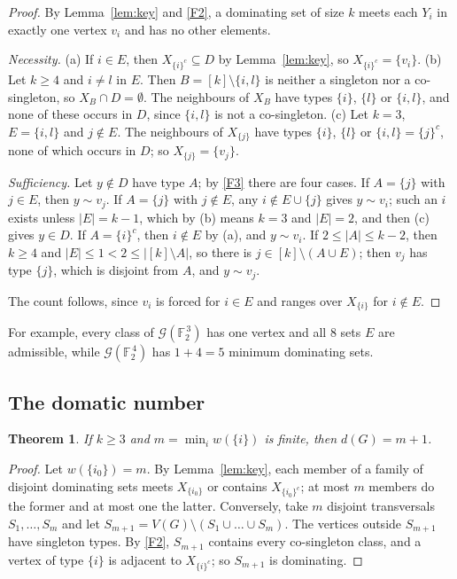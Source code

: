 \documentclass[11pt]{amsart}
\newtheorem{theorem}{Theorem}[section]
\theoremstyle{definition}
\theoremstyle{remark}
\newcommand{\G}{\mathcal{G}}
\newcommand{\FF}{\mathbb{F}}
\newcommand{\Bool}[1]{\FF_2^{\,#1}}
\newcommand{\co}[1]{{#1}^{c}}
\begin{document}
\begin{proof}
By Lemma~\ref{lem:key} and \ref{F2}, a dominating set of size $k$ meets each $Y_i$ in exactly one
vertex $v_i$ and has no other elements.

\emph{Necessity.} (a) If $i\in E$, then $X_{\co{\{i\}}}\subseteq D$ by Lemma~\ref{lem:key}, so
$X_{\co{\{i\}}}=\{v_i\}$. (b) Let $k\ge4$ and $i\ne l$ in $E$. Then $B=[k]\setminus\{i,l\}$ is neither
a singleton nor a co-singleton, so $X_B\cap D=\emptyset$. The neighbours of $X_B$ have types
$\{i\}$, $\{l\}$ or $\{i,l\}$, and none of these occurs in $D$, since $\{i,l\}$ is not a co-singleton.
(c) Let $k=3$, $E=\{i,l\}$ and $j\notin E$. The neighbours of $X_{\{j\}}$ have types $\{i\}$, $\{l\}$
or $\{i,l\}=\co{\{j\}}$, none of which occurs in $D$; so $X_{\{j\}}=\{v_j\}$.

\emph{Sufficiency.} Let $y\notin D$ have type $A$; by \ref{F3} there are four cases. If $A=\{j\}$
with $j\in E$, then $y\sim v_j$. If $A=\{j\}$ with $j\notin E$, any $i\notin E\cup\{j\}$ gives
$y\sim v_i$; such an $i$ exists unless $|E|=k-1$, which by (b) means $k=3$ and $|E|=2$, and then (c)
gives $y\in D$. If $A=\co{\{i\}}$, then $i\notin E$ by (a), and $y\sim v_i$. If $2\le|A|\le k-2$, then
$k\ge4$ and $|E|\le1<2\le|[k]\setminus A|$, so there is $j\in[k]\setminus(A\cup E)$; then $v_j$ has
type $\{j\}$, which is disjoint from $A$, and $y\sim v_j$.

The count follows, since $v_i$ is forced for $i\in E$ and ranges over $X_{\{i\}}$ for $i\notin E$.
\end{proof}

For example, every class of $\G(\Bool3)$ has one vertex and all $8$ sets $E$ are admissible, while
$\G(\Bool4)$ has $1+4=5$ minimum dominating sets.

\subsection{The domatic number}

\begin{theorem}\label{thm:domatic}
If $k\ge3$ and $m=\min_iw(\{i\})$ is finite, then $d(G)=m+1$.
\end{theorem}

\begin{proof}
Let $w(\{i_0\})=m$. By Lemma~\ref{lem:key}, each member of a family of disjoint dominating sets
meets $X_{\{i_0\}}$ or contains $X_{\co{\{i_0\}}}$; at most $m$ members do the former and at most
one the latter. Conversely, take $m$ disjoint transversals $S_1,\dots,S_m$ and let
$S_{m+1}=V(G)\setminus(S_1\cup\dots\cup S_m)$. The vertices outside $S_{m+1}$ have singleton
types. By \ref{F2}, $S_{m+1}$ contains every co-singleton class, and a vertex of type $\{i\}$ is
adjacent to $X_{\co{\{i\}}}$; so $S_{m+1}$ is dominating.
\end{proof}
\end{document}
